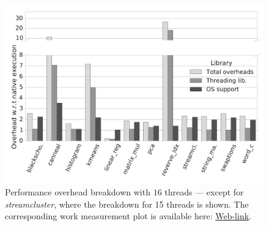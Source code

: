 
\begin{figure}[t]
\centering
\includegraphics[scale=0.25]{figure/benchmarks/times-16-threads.pdf}
\caption{Performance overhead breakdown with $16$ threads --- except for {\em streamcluster}, where the breakdown for 15 threads is shown. The corresponding work measurement plot is available here: \href{https://mic92.github.io/inspector/index.html\#graph4}{Web-link}.}
\label{fig:overheads-breakdown}
\end{figure}
